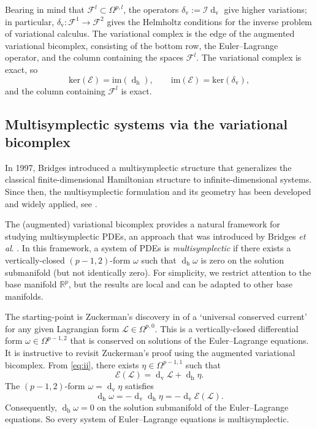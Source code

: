 \documentclass[11pt]{article} %
\numberwithin{equation}{section}
\newcommand{\upd}{\operatorname{d}}
\newcommand{\uph}{\operatorname{h}}
\newcommand{\upv}{\operatorname{v}}
\newcommand{\dv}{\upd_{\upv}\!}
\newcommand{\mcE}{\mathcal{E}}
\newcommand{\mcI}{\mathcal{I}}
\newcommand{\msL}{\mathscr{L}}
\theoremstyle{plain}
\theoremstyle{definition}
\begin{document}
Bearing in mind that $\mathscr{F}^l\subset \Omega^{p,l}$, the operators $\delta_{\upv}:=\mcI\dv $ give higher variations; in particular, $\delta_{\upv}:\mathscr{F}^1\rightarrow \mathscr{F}^2$ gives the Helmholtz conditions for the inverse problem of variational calculus. 
The variational complex is the edge of the augmented variational bicomplex, consisting of the bottom row, the Euler--Lagrange operator, and the column containing the spaces $\mathscr{F}^l$. The variational complex is exact, so
\[
\text{ker}(\mcE)=\text{im}(\upd_{\uph}),\qquad \text{im}(\mcE)=\text{ker}(\delta_{\upv}),
\]
and the column containing $\mathscr{F}^l$ is exact.

\subsection{Multisymplectic systems via the variational bicomplex}

In 1997, Bridges \cite{Br1997b} introduced a multisymplectic structure that generalizes the classical finite-dimensional Hamiltonian
structure to infinite-dimensional systems. Since then, the
multisymplectic formulation and its geometry has been developed and widely applied, see 
\cite{Br1997a,BrRe2001,CoHoHy2007,HuDe2008,SuQi2003,Wa2008,Br2017,CaIbDe1999,La2000,La2004,MaPaSh1998}.


The (augmented) variational bicomplex provides a natural framework for studying multisymplectic PDEs, an approach that was introduced by Bridges \textit{et al}. \cite{BrHyLa2010}. In this framework, a system of PDEs is \textit{multisymplectic} if there exists a vertically-closed $(p-1,2)$-form $\omega$ such that $\upd_{\uph}\!\omega$ is zero on the solution submanifold (but not identically zero). For simplicity, we restrict attention to the base manifold $\mathbb{R}^p$, but the results are local and can be adapted to other base manifolds. 

The starting-point is Zuckerman's discovery in \cite{Zuck} of a `universal conserved current' for any given Lagrangian form $\msL\in \Omega^{p,0}$. This is a vertically-closed differential form $\omega\in\Omega^{p-1,2}$ that is conserved on solutions of the Euler--Lagrange equations. It is instructive to revisit Zuckerman's proof using the augmented variational bicomplex. From \eqref{eq:ii}, there exists $\eta\in\Omega^{p-1,1}$ such that
\begin{equation}\label{fund}
\mcE(\msL)=\dv \msL+\upd_{\uph}\!\eta.
\end{equation}
The $(p-1,2)$-form $\omega=\dv \eta$ satisfies
\begin{equation}\label{dom}
\upd_{\uph}\!\omega=-\dv \upd_{\uph}\!\eta=-\dv \mcE(\msL).
\end{equation}
Consequently, $\upd_{\uph}\!\omega=0$ on the solution submanifold of the Euler--Lagrange equations. So every system of Euler--Lagrange equations is multisymplectic.
\end{document}

